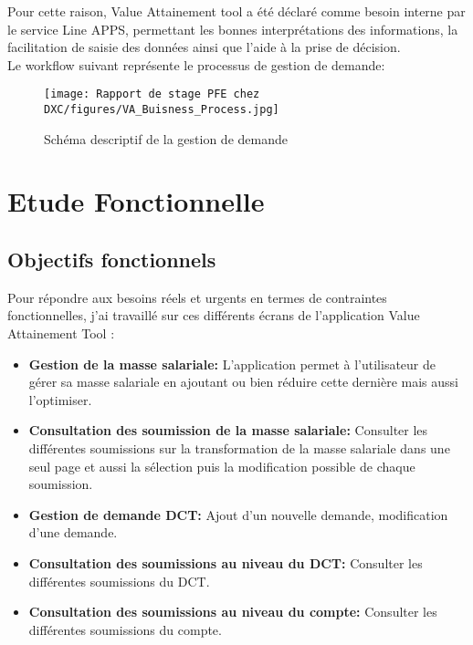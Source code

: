 Pour cette raison, Value Attainement tool a été déclaré comme besoin interne par le service Line APPS, permettant les bonnes interprétations des informations, la facilitation de saisie des données ainsi que l’aide à la prise de décision.
\\

Le workflow suivant représente le processus de gestion de demande:


\begin{figure}[!h]
    \centering
    \texttt{[image: Rapport de stage PFE chez DXC/figures/VA\_Buisness\_Process.jpg]}
    \caption{Schéma descriptif de la gestion de demande}
\end{figure}


\newpage
\section{Etude Fonctionnelle}

\subsection{Objectifs fonctionnels}

Pour répondre aux besoins réels et urgents en termes de contraintes fonctionnelles, j'ai travaillé sur ces différents écrans de l'application Value Attainement Tool :
\\
\begin{itemize}
    \item \textbf{Gestion de la masse salariale:} L'application permet à l'utilisateur de gérer sa masse salariale en ajoutant ou bien réduire cette dernière mais aussi l'optimiser.
    
    \item \textbf{Consultation des soumission de la masse salariale:} Consulter les différentes soumissions sur la transformation de la masse salariale dans une seul page et aussi la sélection puis la modification possible de chaque soumission.
    
    \item \textbf{Gestion de demande DCT:} Ajout d'un nouvelle demande, modification d'une demande.
    
    \item \textbf{Consultation des soumissions au niveau du DCT:} Consulter les différentes soumissions du DCT.
    
    \item \textbf{Consultation des soumissions au niveau du compte:} Consulter les différentes soumissions du compte.
    
\end{itemize}

